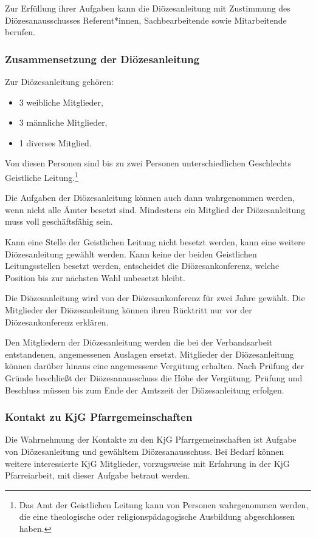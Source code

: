 \documentclass[12pt]{report}
\begin{document}
\begin{justify}
Zur Erfüllung ihrer Aufgaben kann die Diözesanleitung mit Zustimmung des Diözesanausschusses
Referent*innen, Sachbearbeitende sowie Mitarbeitende berufen.

\subsubsection{Zusammensetzung der Diözesanleitung}
Zur Diözesanleitung gehören:
\begin{itemize}
	\item 3 weibliche Mitglieder,
	\item 3 männliche Mitglieder,
	\item 1 diverses Mitglied.
\end{itemize}

Von diesen Personen sind bis zu zwei Personen unterschiedlichen Geschlechts
Geistliche Leitung.\footnote{Das Amt der Geistlichen Leitung kann von Personen
  wahrgenommen werden, die eine theologische oder religionspädagogische
  Ausbildung abgeschlossen haben.}

Die Aufgaben der Diözesanleitung können auch dann wahrgenommen werden, wenn nicht alle
Ämter besetzt sind. Mindestens ein Mitglied der Diözesanleitung muss voll geschäftsfähig sein.

Kann eine Stelle der Geistlichen Leitung nicht besetzt werden, kann eine weitere Diözesanleitung
gewählt werden. Kann keine der beiden Geistlichen Leitungsstellen besetzt werden, entscheidet
die Diözesankonferenz, welche Position bis zur nächsten Wahl unbesetzt bleibt.

Die Diözesanleitung wird von der Diözesankonferenz für zwei Jahre gewählt. Die Mitglieder der
Diözesanleitung können ihren Rücktritt nur vor der Diözesankonferenz erklären.

Den Mitgliedern der Diözesanleitung werden die bei der Verbandsarbeit entstandenen, angemessenen Auslagen
ersetzt. Mitglieder der Diözesanleitung können darüber hinaus eine angemessene Vergütung erhalten. Nach Prüfung der Gründe beschließt der Diözesanausschuss die Höhe der Vergütung. Prüfung und Beschluss müssen bis zum Ende der Amtszeit der Diözesanleitung erfolgen.

\subsubsection{Kontakt zu KjG Pfarrgemeinschaften}
Die Wahrnehmung der Kontakte zu den KjG Pfarrgemeinschaften ist Aufgabe von Diözesanleitung
und gewähltem Diözesanausschuss. Bei Bedarf können weitere interessierte KjG Mitglieder,
vorzugsweise mit Erfahrung in der KjG Pfarreiarbeit, mit dieser Aufgabe betraut werden.


\end{justify}
\end{document}
